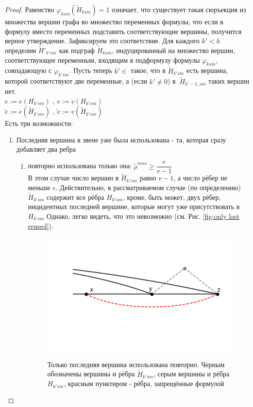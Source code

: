 \begin{proof}
Равенство
$\varphi_{ksm}(\tilde H_{ksm}) = 1$
означает, что существует такая сюръекция из множества вершин графа во множество переменных формулы, что если в формулу вместо переменных подставить соответствующие вершины, получится верное утверждение.
Зафиксируем это соответствие.
Для каждого $k' < k$ определим $\tilde H'_{k'sm}$ как подграф $\tilde H_{ksm}$, индуцированный на множество вершин, соответствующее переменным, входящим в подформулу формулы $\varphi_{ksm}$, совпадающую с $\varphi_{k'sm}$.
Пусть теперь $k' \in $ такое, что в $\tilde H_{k'sm}$ есть вершина, которой соответствуют две переменные, а (если $k' \neq 0$) в $~\tilde H_{k'-1,sm}$ таких вершин нет.\\
$e:= e(H_{k'sm})$ , $v:= v(H_{k'sm})$\\
$\tilde e:= e(\tilde H_{k'sm})$ , $\tilde v:= v(\tilde H_{k'sm})$\\
Есть три возможности:
\begin{enumerate}
\item 
Последняя вершина в звене уже была использована - та, которая сразу добавляет два ребра
\begin{enumerate}
\item 
повторно использована только она: $\tilde \rho^{max} \geq \dfrac{e}{v-1}$ \\
В этом случае число вершин в $\tilde H_{k'sm}$ равно $v-1$, а число рёбер не меньше $e$. Действительно, в рассматриваемом случае (по определению) $\tilde H_{k'sm}$ содержит все рёбра $H_{k'sm}$, кроме, быть может, двух рёбер, инцидентных последней вершине, которые могут уже присутствовать в $H_{k'sm}$
Однако, легко видеть, что это невозможно (см. Рис. \ref{fig:only last reused}).
\begin{figure}
  \centering
  \includegraphics[scale=0.5]{picrel/only_last_reused.png}
  \caption{Только последняя вершина использована повторно. Черным обозначены вершины и рёбра $\tilde H_{k'sm}$, серым вершины и рёбра  $H_{k'sm}$, красным пунктиром - рёбра, запрещённые формулой  }

\end{figure}
\end{enumerate}
\end{enumerate}
\end{proof}
